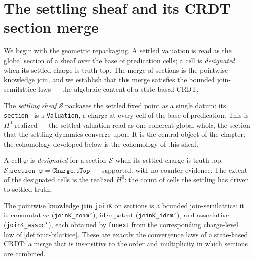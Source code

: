 \section{The settling sheaf and its CRDT section merge}

We begin with the geometric repackaging. A settled valuation is read as the global section of a sheaf over the base of predication cells; a cell is \emph{designated} when its settled charge is truth-top. The merge of sections is the pointwise knowledge join, and we establish that this merge satisfies the bounded join-semilattice laws --- the algebraic content of a state-based CRDT.

\begin{definition}\label{def:settling-sheaf}\leanok{}
The \emph{settling sheaf} $\mathcal{S}$ packages the settled fixed point as a single datum: its \texttt{section\_} is a \texttt{Valuation}, a charge at every cell of the base of predication. This is $H^0$ realized --- the settled valuation read as one coherent global whole, the section that the settling dynamics converge upon. It is the central object of the chapter; the cohomology developed below is the cohomology of this sheaf.
\end{definition}

\begin{definition}\label{def:sheaf-designated}\leanok{}
A cell $\varphi$ is \emph{designated} for a section $\mathcal{S}$ when its settled charge is truth-top: $\mathcal{S}.\texttt{section\_}\,\varphi = \texttt{Charge.tTop}$ --- supported, with no counter-evidence. The extent of the designated cells is the realized $H^0$: the count of cells the settling has driven to settled truth.
\end{definition}

\begin{theorem}\label{def:section-merge-crdt}\leanok{}
The pointwise knowledge join \texttt{joinK} on sections is a bounded join-semilattice: it is commutative (\texttt{joinK\_comm'}), idempotent (\texttt{joinK\_idem'}), and associative (\texttt{joinK\_assoc'}), each obtained by \texttt{funext} from the corresponding charge-level law of \cref{def:four-bilattice}. These are exactly the convergence laws of a state-based CRDT: a merge that is insensitive to the order and multiplicity in which sections are combined.
\end{theorem}


